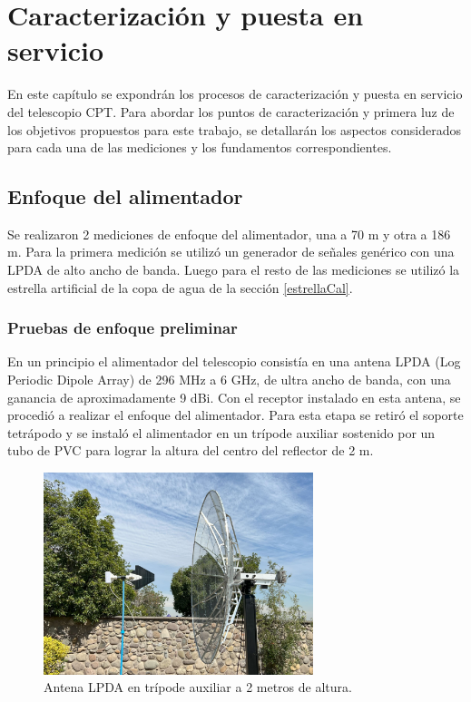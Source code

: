 \chapter{Caracterización y puesta en servicio}

En este capítulo se expondrán los procesos de caracterización y puesta en servicio del telescopio CPT. Para abordar los puntos de caracterización y primera luz de los objetivos propuestos para este trabajo, se detallarán los aspectos considerados para cada una de las mediciones y los fundamentos correspondientes.

\section{Enfoque del alimentador}

Se realizaron 2 mediciones de enfoque del alimentador, una a 70 m y otra a 186 m. Para la primera medición se utilizó un generador de señales genérico con una LPDA de alto ancho de banda. Luego para el resto de las mediciones se utilizó la estrella artificial de la copa de agua de la sección \ref{estrellaCal}.\\

\subsection{Pruebas de enfoque preliminar}

En un principio el alimentador del telescopio consistía en una antena LPDA (Log Periodic Dipole Array) de 296 MHz a 6 GHz, de ultra ancho de banda, con una ganancia de aproximadamente 9 dBi. Con el receptor instalado en esta antena, se procedió a realizar el enfoque del alimentador. Para esta etapa se retiró el soporte tetrápodo y se instaló el alimentador en un trípode auxiliar sostenido por un tubo de PVC para lograr la altura del centro del reflector de 2 m.\\

\begin{figure}
    \centering
    \includegraphics[width=0.7\textwidth]{img/enfoque1}
    \caption{Antena LPDA en trípode auxiliar a 2 metros de altura.}
    \label{fig:antena_lpda}
\end{figure}

